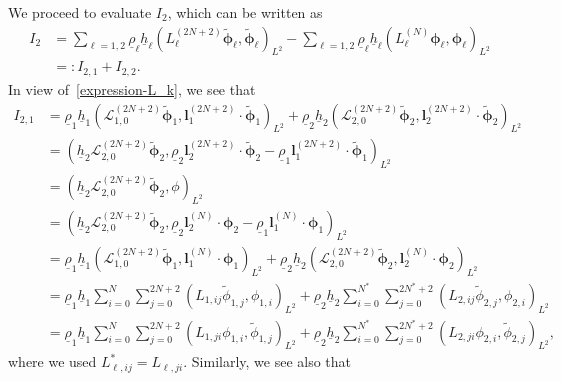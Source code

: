 \documentclass[11pt,leqno]{article}
\numberwithin{equation}{section}
\numberwithin{figure}{section}
\begin{document}
We proceed to evaluate $I_2$, which can be written as 
%
\begin{align*}
I_2 
&= \sum_{\ell=1,2}\underline{\rho}_\ell\underline{h}_\ell (L_\ell^{(2N+2)}\tilde{\bm{\phi}}_\ell,\tilde{\bm{\phi}}_\ell)_{L^2}
 - \sum_{\ell=1,2}\underline{\rho}_\ell\underline{h}_\ell (L_\ell^{(N)}\bm{\phi}_\ell,\bm{\phi}_\ell)_{L^2} \\
&=: I_{2,1}+I_{2,2}.
\end{align*}
%
In view of~\eqref{expression-L_k}, we see that 
%
\begin{align*}
I_{2,1}
&= \underline{\rho}_1\underline{h}_1(\mathcal{L}_{1,0}^{(2N+2)}\tilde{\bm{\phi}}_1,\bm{l}_1^{(2N+2)}\cdot\tilde{\bm{\phi}}_1)_{L^2}
 + \underline{\rho}_2\underline{h}_2(\mathcal{L}_{2,0}^{(2N+2)}\tilde{\bm{\phi}}_2,\bm{l}_2^{(2N+2)}\cdot\tilde{\bm{\phi}}_2)_{L^2} \\
&= (\underline{h}_2\mathcal{L}_{2,0}^{(2N+2)}\tilde{\bm{\phi}}_2,
 \underline{\rho}_2\bm{l}_2^{(2N+2)}\cdot\tilde{\bm{\phi}}_2 - \underline{\rho}_1\bm{l}_1^{(2N+2)}\cdot\tilde{\bm{\phi}}_1)_{L^2} \\
&= (\underline{h}_2\mathcal{L}_{2,0}^{(2N+2)}\tilde{\bm{\phi}}_2,\phi)_{L^2} \\
&= (\underline{h}_2\mathcal{L}_{2,0}^{(2N+2)}\tilde{\bm{\phi}}_2,
 \underline{\rho}_2\bm{l}_2^{(N)}\cdot\bm{\phi}_2 - \underline{\rho}_1\bm{l}_1^{(N)}\cdot\bm{\phi}_1)_{L^2} \\
&= \underline{\rho}_1\underline{h}_1(\mathcal{L}_{1,0}^{(2N+2)}\tilde{\bm{\phi}}_1,\bm{l}_1^{(N)}\cdot\bm{\phi}_1)_{L^2}
 + \underline{\rho}_2\underline{h}_2(\mathcal{L}_{2,0}^{(2N+2)}\tilde{\bm{\phi}}_2,\bm{l}_2^{(N)}\cdot\bm{\phi}_2)_{L^2} \\
&= \underline{\rho}_1\underline{h}_1 \sum_{i=0}^N\sum_{j=0}^{2N+2} (L_{1,ij}\tilde{\phi}_{1,j},\phi_{1,i})_{L^2}
 + \underline{\rho}_2\underline{h}_2 \sum_{i=0}^{N^*}\sum_{j=0}^{2N^*+2} (L_{2,ij}\tilde{\phi}_{2,j},\phi_{2,i})_{L^2} \\
&= \underline{\rho}_1\underline{h}_1 \sum_{i=0}^N\sum_{j=0}^{2N+2} (L_{1,ji}\phi_{1,i},\tilde{\phi}_{1,j})_{L^2}
 + \underline{\rho}_2\underline{h}_2 \sum_{i=0}^{N^*}\sum_{j=0}^{2N^*+2} (L_{2,ji}\phi_{2,i},\tilde{\phi}_{2,j})_{L^2},
\end{align*}
%
where we used $L_{\ell,ij}^*=L_{\ell,ji}$. 
Similarly, we see also that 
%
\end{document}
